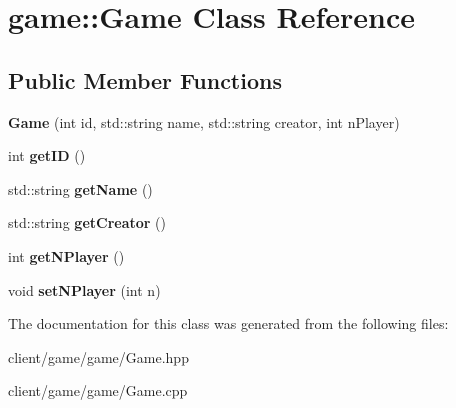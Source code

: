 \hypertarget{classgame_1_1_game}{\section{game\-:\-:Game Class Reference}
\label{classgame_1_1_game}
}
\subsection*{Public Member Functions}
\begin{DoxyCompactItemize}
\item 
\hypertarget{classgame_1_1_game_a896cd12e9ab2e517767f9032a890c720}{{\bfseries Game} (int id, std\-::string name, std\-::string creator, int n\-Player)}\label{classgame_1_1_game_a896cd12e9ab2e517767f9032a890c720}

\item 
\hypertarget{classgame_1_1_game_acad633ab123b2c25e0fdd8312d44a2a3}{int {\bfseries get\-I\-D} ()}\label{classgame_1_1_game_acad633ab123b2c25e0fdd8312d44a2a3}

\item 
\hypertarget{classgame_1_1_game_a39b6c7fbef4fa6afc9c8115b74b49ca3}{std\-::string {\bfseries get\-Name} ()}\label{classgame_1_1_game_a39b6c7fbef4fa6afc9c8115b74b49ca3}

\item 
\hypertarget{classgame_1_1_game_afe35613a67c5bc9a726322b8e4c83c66}{std\-::string {\bfseries get\-Creator} ()}\label{classgame_1_1_game_afe35613a67c5bc9a726322b8e4c83c66}

\item 
\hypertarget{classgame_1_1_game_a1c290b7f0256bffb653785d7aeb88648}{int {\bfseries get\-N\-Player} ()}\label{classgame_1_1_game_a1c290b7f0256bffb653785d7aeb88648}

\item 
\hypertarget{classgame_1_1_game_a37447e8f9c346ca95d178d36daced653}{void {\bfseries set\-N\-Player} (int n)}\label{classgame_1_1_game_a37447e8f9c346ca95d178d36daced653}

\end{DoxyCompactItemize}


The documentation for this class was generated from the following files\-:\begin{DoxyCompactItemize}
\item 
client/game/game/Game.\-hpp\item 
client/game/game/Game.\-cpp\end{DoxyCompactItemize}
